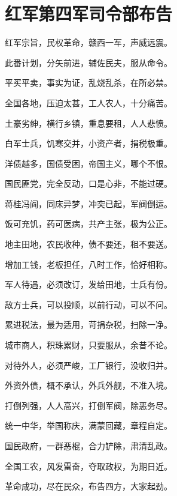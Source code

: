 \section[红军第四军司令部布告（一九二九年）]{红军第四军司令部布告}


红军宗旨，民权革命，赣西一军，声威远震。

此番计划，分矢前进，辅佐民夫，服从命令。

平买平卖，事实为证，乱烧乱杀，在所必禁。

全国各地，压迫太甚，工人农人，十分痛苦。

土豪劣绅，横行乡镇，重息要租，人人悲愤。

白军士兵，饥寒交并，小资产者，捐税极重。

洋债越多，国债受困，帝国主义，哪个不恨。

国民匪党，完全反动，口是心非，不能过硬。

蒋桂冯阎，同床异梦，冲突已起，军阀倒运。

饭可充饥，药可医病，共产主张，极为公正。

地主田地，农民收种，债不要还，租不要送。

增加工钱，老板担任，八时工作，恰好相称。

军人待遇，必须改订，发给田地，士兵有份。

敌方士兵，可以投顺，以前行动，可以不问。

累进税法，最为适用，苛捐杂税，扫除一净。

城市商人，积珠累财，只要服从，余昔不论。

对待外人，必须严峻，工厂银行，没收归并。

外资外债，概不承认，外兵外舰，不准入境。

打倒列强，人人高兴，打倒军阀，除恶务尽。

统一中华，举国称庆，满蒙回藏，章程自定。

国民政府，一群恶棍，合力铲除，肃清乱政。

全国工农，风发雷奋，夺取政权，为期日近。

革命成功，尽在民众，布告四方，大家起劲。

